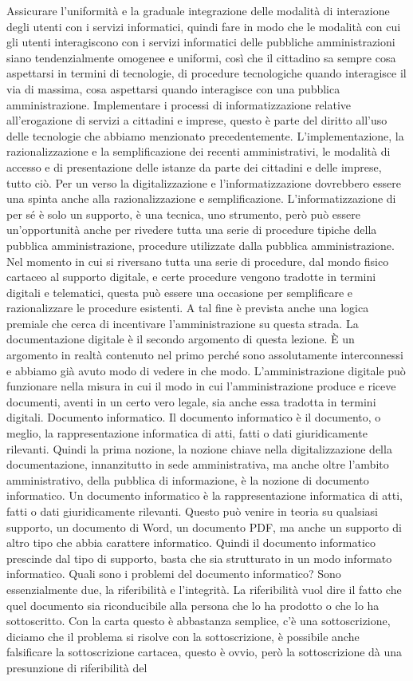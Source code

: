 Assicurare l'uniformità e la graduale integrazione delle modalità di interazione degli utenti con i servizi informatici, quindi fare in modo che le modalità con cui gli utenti interagiscono con i servizi informatici delle pubbliche amministrazioni siano tendenzialmente omogenee e uniformi, così che il cittadino sa sempre cosa aspettarsi in termini di tecnologie, di procedure tecnologiche quando interagisce il via di massima, cosa aspettarsi quando interagisce con una pubblica amministrazione. Implementare i processi di informatizzazione relative all'erogazione di servizi a cittadini e imprese, questo è parte del diritto all'uso delle tecnologie che abbiamo menzionato precedentemente. L'implementazione, la razionalizzazione e la semplificazione dei recenti amministrativi, le modalità di accesso e di presentazione delle istanze da parte dei cittadini e delle imprese, tutto ciò. Per un verso la digitalizzazione e l'informatizzazione dovrebbero essere una spinta anche alla razionalizzazione e semplificazione. L'informatizzazione di per sé è solo un supporto, è una tecnica, uno strumento, però può essere un'opportunità anche per rivedere tutta una serie di procedure tipiche della pubblica amministrazione, procedure utilizzate dalla pubblica amministrazione. Nel momento in cui si riversano tutta una serie di procedure, dal mondo fisico cartaceo al supporto digitale, e certe procedure vengono tradotte in termini digitali e telematici, questa può essere una occasione per semplificare e razionalizzare le procedure esistenti. A tal fine è prevista anche una logica premiale che cerca di incentivare l'amministrazione su questa strada. La documentazione digitale è il secondo argomento di questa lezione. È un argomento in realtà contenuto nel primo perché sono assolutamente interconnessi e abbiamo già avuto modo di vedere in che modo. L'amministrazione digitale può funzionare nella misura in cui il modo in cui l'amministrazione produce e riceve documenti, aventi in un certo vero legale, sia anche essa tradotta in termini digitali. Documento informatico. Il documento informatico è il documento, o meglio, la rappresentazione informatica di atti, fatti o dati giuridicamente rilevanti. Quindi la prima nozione, la nozione chiave nella digitalizzazione della documentazione, innanzitutto in sede amministrativa, ma anche oltre l'ambito amministrativo, della pubblica di informazione, è la nozione di documento informatico. Un documento informatico è la rappresentazione informatica di atti, fatti o dati giuridicamente rilevanti. Questo può venire in teoria su qualsiasi supporto, un documento di Word, un documento PDF, ma anche un supporto di altro tipo che abbia carattere informatico. Quindi il documento informatico prescinde dal tipo di supporto, basta che sia strutturato in un modo informato informatico. Quali sono i problemi del documento informatico? Sono essenzialmente due, la riferibilità e l'integrità. La riferibilità vuol dire il fatto che quel documento sia riconducibile alla persona che lo ha prodotto o che lo ha sottoscritto. Con la carta questo è abbastanza semplice, c'è una sottoscrizione, diciamo che il problema si risolve con la sottoscrizione, è possibile anche falsificare la sottoscrizione cartacea, questo è ovvio, però la sottoscrizione dà una presunzione di riferibilità del 